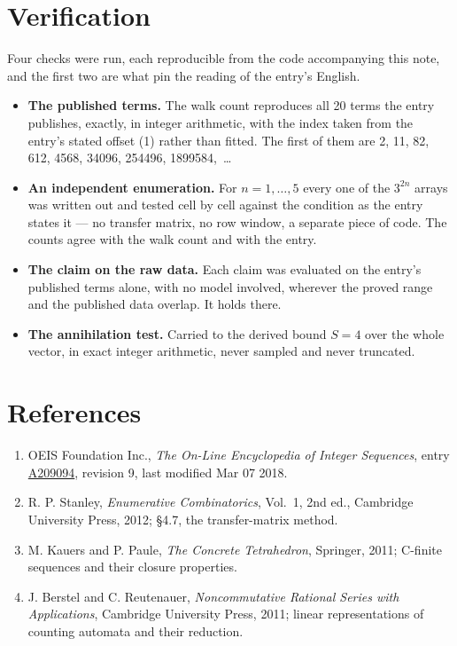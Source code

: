 \documentclass[11pt]{article}
\theoremstyle{definition}
\begin{document}
\section{Verification}

Four checks were run, each reproducible from the code accompanying this note, and the first two are what pin the reading of the entry's English.

\begin{itemize}

\item {\bfseries The published terms.} The walk count reproduces all 20 terms the entry publishes, exactly, in integer arithmetic, with the index taken from the entry's stated offset (1) rather than fitted. The first of them are 2, 11, 82, 612, 4568, 34096, 254496, 1899584,~\dots

\item {\bfseries An independent enumeration.} For $n = 1,\dots,5$ every one of the $3^{2n}$ arrays was written out and tested cell by cell against the condition as the entry states it --- no transfer matrix, no row window, a separate piece of code. The counts agree with the walk count and with the entry.

\item {\bfseries The claim on the raw data.} Each claim was evaluated on the entry's published terms alone, with no model involved, wherever the proved range and the published data overlap. It holds there.

\item {\bfseries The annihilation test.} Carried to the derived bound $S = 4$ over the whole vector, in exact integer arithmetic, never sampled and never truncated.

\end{itemize}

\section{References}

\begin{enumerate}

\item OEIS Foundation Inc., \emph{The On-Line Encyclopedia of Integer Sequences}, entry \href{https://oeis.org/A209094}{A209094}, revision 9, last modified Mar 07 2018.

\item R. P. Stanley, \emph{Enumerative Combinatorics}, Vol.~1, 2nd ed., Cambridge University Press, 2012; \S4.7, the transfer-matrix method.

\item M. Kauers and P. Paule, \emph{The Concrete Tetrahedron}, Springer, 2011; C-finite sequences and their closure properties.

\item J. Berstel and C. Reutenauer, \emph{Noncommutative Rational Series with Applications}, Cambridge University Press, 2011; linear representations of counting automata and their reduction.

\end{enumerate}
\end{document}
